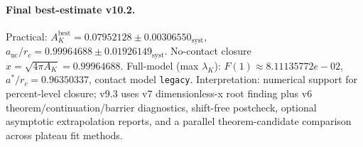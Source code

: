 \paragraph{Final best-estimate v10.2.}
Practical: $A_K^{\mathrm{best}} = 0.07952128 \pm 0.00306550_{\mathrm{syst}}$, $a_{\mathrm{nc}}/r_c = 0.99964688 \pm 0.01926149_{\mathrm{syst}}$.
No-contact closure $x = \sqrt{4\pi A_K} = 0.99964688$.
Full-model (max $\lambda_K$): $F(1) \approx 8.11135772e-02$, $a^*/r_c = 0.96350337$, contact model \texttt{legacy}.
Interpretation: numerical support for percent-level closure; v9.3 uses v7 dimensionless-x root finding plus v6 theorem/continuation/barrier diagnostics, shift-free postcheck, optional asymptotic extrapolation reports, and a parallel theorem-candidate comparison across plateau fit methods.
